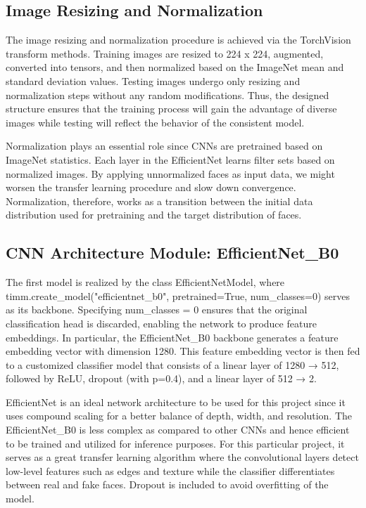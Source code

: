 \documentclass[12pt,a4paper]{report}
\begin{document}
\subsection{Image Resizing and Normalization}

The image resizing and normalization procedure is achieved via the TorchVision transform methods. Training images are resized to 224 x 224, augmented, converted into tensors, and then normalized based on the ImageNet mean and standard deviation values. Testing images undergo only resizing and normalization steps without any random modifications. Thus, the designed structure ensures that the training process will gain the advantage of diverse images while testing will reflect the behavior of the consistent model.

Normalization plays an essential role since CNNs are pretrained based on ImageNet statistics. Each layer in the EfficientNet learns filter sets based on normalized images. By applying unnormalized faces as input data, we might worsen the transfer learning procedure and slow down convergence. Normalization, therefore, works as a transition between the initial data distribution used for pretraining and the target distribution of faces.

\subsection{CNN Architecture Module: EfficientNet\_B0}

The first model is realized by the class EfficientNetModel, where timm.create\_model("efficientnet\_b0", pretrained=True, num\_classes=0) serves as its backbone. Specifying num\_classes = 0 ensures that the original classification head is discarded, enabling the network to produce feature embeddings. In particular, the EfficientNet\_B0 backbone generates a feature embedding vector with dimension 1280. This feature embedding vector is then fed to a customized classifier model that consists of a linear layer of 1280 → 512, followed by ReLU, dropout (with p=0.4), and a linear layer of 512 → 2.

EfficientNet is an ideal network architecture to be used for this project since it uses compound scaling for a better balance of depth, width, and resolution. The EfficientNet\_B0 is less complex as compared to other CNNs and hence efficient to be trained and utilized for inference purposes. For this particular project, it serves as a great transfer learning algorithm where the convolutional layers detect low-level features such as edges and texture while the classifier differentiates between real and fake faces. Dropout is included to avoid overfitting of the model.
\end{document}
